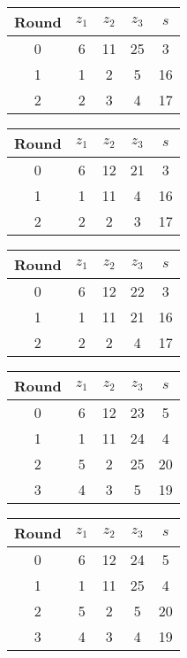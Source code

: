 \begin{table}
\begin{tabular}{c | c | c | c | c }
Round & $z_1$ & $z_2$ & $z_3$ & $s$ \\
\hline
0 & 6 & 11 & 25 & 3 \\
1 & 1 & 2 & 5 & 16 \\
2 & 2 & 3 & 4 & 17
\end{tabular}
\end{table}

\begin{table}
\begin{tabular}{c | c | c | c | c }
Round & $z_1$ & $z_2$ & $z_3$ & $s$ \\
\hline
0 & 6 & 12 & 21 & 3 \\
1 & 1 & 11 & 4 & 16 \\
2 & 2 & 2 & 3 & 17
\end{tabular}
\end{table}

\begin{table}
\begin{tabular}{c | c | c | c | c }
Round & $z_1$ & $z_2$ & $z_3$ & $s$ \\
\hline
0 & 6 & 12 & 22 & 3 \\
1 & 1 & 11 & 21 & 16 \\
2 & 2 & 2 & 4 & 17
\end{tabular}
\end{table}

\begin{table}
\begin{tabular}{c | c | c | c | c }
Round & $z_1$ & $z_2$ & $z_3$ & $s$ \\
\hline
0 & 6 & 12 & 23 & 5 \\
1 & 1 & 11 & 24 & 4 \\
2 & 5 & 2 & 25 & 20 \\
3 & 4 & 3 & 5 & 19
\end{tabular}
\end{table}

\begin{table}
\begin{tabular}{c | c | c | c | c }
Round & $z_1$ & $z_2$ & $z_3$ & $s$ \\
\hline
0 & 6 & 12 & 24 & 5 \\
1 & 1 & 11 & 25 & 4 \\
2 & 5 & 2 & 5 & 20 \\
3 & 4 & 3 & 4 & 19
\end{tabular}
\end{table}

